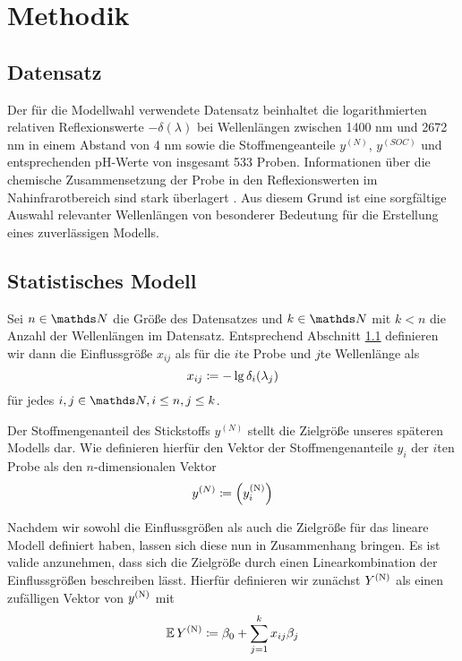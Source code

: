 \section{Methodik}
\label{sec:Methodik}

	\subsection{Datensatz}
	\label{ssec:Datensatz}

	    Der für die Modellwahl verwendete Datensatz beinhaltet die logarithmierten relativen Reflexionswerte $-\delta(\lambda)$ bei Wellenlängen zwischen 1400 nm und 2672 nm in einem Abstand von 4 nm sowie die Stoffmengeanteile $y^{(N)}$, $y^{(SOC)}$ und entsprechenden pH-Werte von insgesamt 533 Proben.
	    Informationen über die chemische Zusammensetzung der Probe in den Reflexionswerten im Nahinfrarotbereich sind stark überlagert \cite{Agelet2010}.
	    Aus diesem Grund ist eine sorgfältige Auswahl relevanter Wellenlängen von besonderer Bedeutung für die Erstellung eines zuverlässigen Modells.



	\subsection{Statistisches Modell}
	\label{ssec:Statistisches Modell}

	    Sei $n\in\SN$ die Größe des Datensatzes und $k\in\SN$ mit $k< n$ die Anzahl der Wellenlängen im Datensatz.
	    Entsprechend Abschnitt \ref{ssec:Datensatz} definieren wir dann die Einflussgröße $x_{ij}$ als für die $i$te Probe und $j$te Wellenlänge als
	    \[
			x_{ij} \coloneqq -\lg \delta_i(\lambda_j)
		\]
		für jedes $i,j\in\SN,i\leq n,j\leq k$.

	    Der Stoffmengenanteil des Stickstoffs  $y^{(N)}$ stellt die Zielgröße unseres späteren Modells dar.
	    Wie definieren hierfür den Vektor der Stoffmengenanteile $y_i$ der $i$ten Probe als den $n$-dimensionalen Vektor
		\[
			 y^{(N)} \coloneqq \left( y^{\mathrm{(N)}}_i \right)
		\]

        Nachdem wir sowohl die Einflussgrößen als auch die Zielgröße für das lineare Modell definiert haben, lassen sich diese nun in Zusammenhang bringen.
        Es ist valide anzunehmen, dass sich die Zielgröße durch einen Linearkombination der Einflussgrößen beschreiben lässt.
        Hierfür definieren wir zunächst $Y^{\mathrm{(N)}}$ als einen zufälligen Vektor von $y^{\mathrm{(N)}}$ mit
        \[
			 \operatorname{\mathbb{E}} Y^{\mathrm{(N)}} \coloneqq \beta_0 + \sum_{j=1}^k{x_{ij}\beta_j}
		\]


